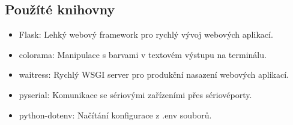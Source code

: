 \subsection*{Použíté knihovny}
\begin{itemize}
    \item Flask: Lehký webový framework pro rychlý vývoj webových aplikací.
    \item colorama: Manipulace s barvami v textovém výstupu na terminálu.
    \item waitress: Rychlý WSGI server pro produkční nasazení webových aplikací.
    \item pyserial: Komunikace se sériovými zařízeními přes sériovéporty.
    \item python-dotenv: Načítání konfigurace z .env souborů.
\end{itemize}

